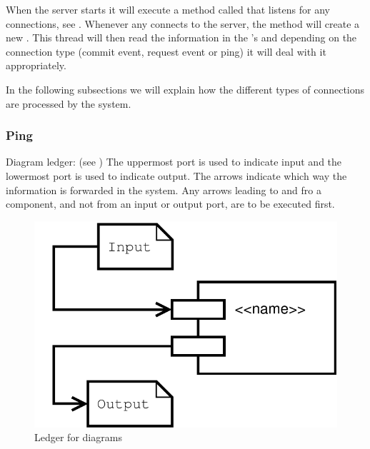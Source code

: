 When the server starts it will execute a method called  that listens for any connections, see .
Whenever any  connects to the server, the  method will create a new .
This thread will then read the information in the 's  and depending on the connection type (commit event, request event or ping) it will deal with it appropriately.



In the following subsections we will explain how the different types of connections are processed by the system.


\subsubsection{Ping}
\label{sec:IOPing}

Diagram ledger: (see )\newline
The uppermost port is used to indicate input and the lowermost port is used to indicate output. The arrows indicate which way the information is forwarded in the system. Any arrows leading to and fro a component, and not from an input or output port, are to be executed first.	\newline
\begin{figure}[H]
	\centering
		\includegraphics[scale=0.40]{images/ledger} %
	\caption{Ledger for diagrams}
	\label{fig:IOLedger}
\end{figure}

